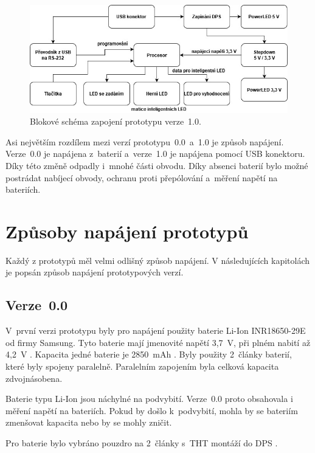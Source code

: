   \begin{figure}[!h]
    \begin{center}
      \includegraphics[scale=0.5]{obrazky/v1_blokove_schema.jpg}
    \end{center}
    \caption[Blokové schéma zapojení prototypu verze~1.0]{Blokové schéma zapojení prototypu verze~1.0.}
  \end{figure}

  Asi největším rozdílem mezi verzí prototypu~0.0~a~1.0 je způsob napájení. Verze~0.0 je napájena z~baterií a~verze~1.0 je napájena pomocí USB 
  konektoru. Díky této změně 
  odpadly i~mnohé části obvodu. Díky absenci baterií bylo možné postrádat nabíjecí obvody, ochranu proti přepólování a~měření napětí 
  na bateriích.       

  \section{Způsoby napájení prototypů}
  Každý z prototypů měl velmi odlišný způsob napájení. V následujících kapitolách je popsán způsob napájení prototypových verzí.

  \subsection{Verze~0.0}
  V~první verzi prototypu byly pro napájení použity baterie Li-Ion INR18650-29E od firmy Samsung. Tyto baterie mají jmenovité napětí 3,7~V, 
  při plném nabití až 4,2~V \cite{18650}. Kapacita jedné baterie je 2850~mAh \cite{18650}. Byly použity 2~články baterií, které byly spojeny 
  paralelně. Paralelním zapojením byla celková kapacita zdvojnásobena.

  Baterie typu Li-Ion jsou náchylné na podvybití. Verze~0.0 proto obsahovala i měření napětí na bateriích. Pokud by došlo k~podvybití, mohla 
  by se bateriím zmenšovat kapacita nebo by se mohly zničit. 

  Pro baterie bylo vybráno pouzdro na 2~články s~THT montáží do DPS \cite{18650_pouzdro}.

